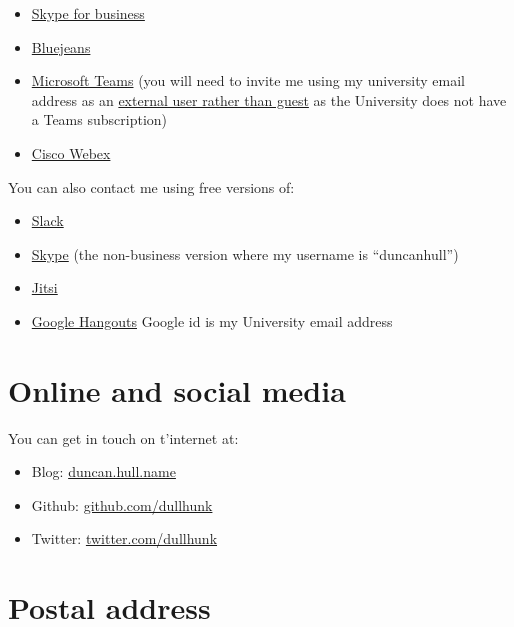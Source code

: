 \documentclass[
  12pt,
]{book}
\providecommand{\tightlist}{%
  \setlength{\itemsep}{0pt}\setlength{\parskip}{0pt}}
\begin{document}
\begin{itemize}
\tightlist
\item
  \href{https://en.wikipedia.org/wiki/Skype_for_Business}{Skype for business}
\item
  \href{https://en.wikipedia.org/wiki/BlueJeans}{Bluejeans}
\item
  \href{https://en.wikipedia.org/wiki/Microsoft_Teams}{Microsoft Teams} (you will need to invite me using my university email address as an \href{https://docs.microsoft.com/en-us/microsoftteams/manage-external-access}{external user rather than guest} as the University does not have a Teams subscription)
\item
  \href{https://en.wikipedia.org/wiki/Cisco_Webex}{Cisco Webex}
\end{itemize}

You can also contact me using free versions of:

\begin{itemize}
\tightlist
\item
  \href{https://en.wikipedia.org/wiki/Slack_(software)}{Slack}
\item
  \href{https://en.wikipedia.org/wiki/Skype}{Skype} (the non-business version where my username is ``duncanhull'')
\item
  \href{https://en.wikipedia.org/wiki/Jitsi}{Jitsi}
\item
  \href{https://en.wikipedia.org/wiki/Google_Hangouts}{Google Hangouts} Google id is my University email address
\end{itemize}

\hypertarget{online-and-social-media}{%
\section{Online and social media}\label{online-and-social-media}}

You can get in touch on t'internet at:

\begin{itemize}
\tightlist
\item
  Blog: \href{https://duncan.hull.name}{duncan.hull.name}
\item
  Github: \href{https://github.com/dullhunk}{github.com/dullhunk}
\item
  Twitter: \href{https://twitter.com/dullhunk}{twitter.com/dullhunk}
\end{itemize}

\hypertarget{postal-address}{%
\section{Postal address}\label{postal-address}}
\end{document}
